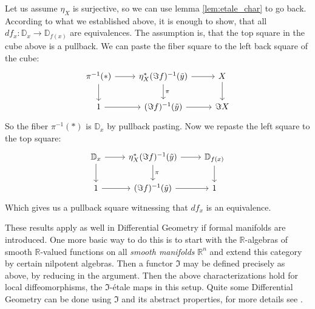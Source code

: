 \documentclass[9pt,twosided]{amsart}
\newcommand{\bD}{\mathbb D}
\newcommand{\bR}{\mathbb R}
\begin{document}
Let us assume $\eta_X$ is surjective, so we can use lemma \ref{lem:etale_char} to go back.
According to what we established above, it is enough to show, that all $df_x:\bD_x\to \bD_{f(x)}$ are equivalences.
The assumption is, that the top square in the cube above is a pullback.
We can paste the fiber square to the left back square of the cube:
\begin{equation*}
  \begin{tikzcd}
      \pi^{-1}(\ast)\arrow[r]\arrow[d] & \eta_X^\ast(\Im f)^{-1}(\tilde{y})\arrow[r]\arrow[d, "\pi"] & X\arrow[d] \\
      1\arrow[r]                                & (\Im f)^{-1}(\tilde{y})\arrow[r] & \Im X
  \end{tikzcd}
\end{equation*}
So the fiber $\pi^{-1}(\ast)$ is $\bD_x$ by pullback pasting. Now we repaste the left square to the top square:
\begin{equation*}
  \begin{tikzcd}
      \bD_x\arrow[d]\arrow[r] & \eta_X^\ast(\Im f)^{-1}(\tilde{y})\arrow[r]\arrow[d, "\pi"] & \bD_{f(x)}\arrow[d] \\
      1\arrow[r]                                & (\Im f)^{-1}(\tilde{y})\arrow[r] & 1 
  \end{tikzcd}
\end{equation*}
Which gives us a pullback square witnessing that $df_x$ is an equivalence.  

These results apply as well in Differential Geometry if formal manifolds are introduced.
One more basic way to do this is to start with the $\bR$-algebras of smooth $\bR$-valued functions on all \emph{smooth manifolds} $\bR^n$ and extend this category by certain nilpotent algebras.
Then a functor $\Im$ may be defined precisely as above, by reducing in the argument.
Then the above characterizations hold for local diffeomorphisms, the $\Im$-étale maps in this setup.
Quite some Differential Geometry can be done using $\Im$ and its abstract properties, for more details see \cite{SyntheticPDEs}.

\printbibliography
\end{document}

